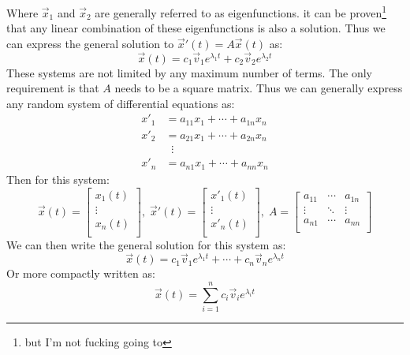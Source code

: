 \documentclass[11pt, a4paper]{article}
\begin{document}
Where $\vec{x}_1$ and $\vec{x}_2$ are generally referred to as eigenfunctions. it can be proven\footnote{but I'm not fucking going to} that any linear combination of these eigenfunctions is also a solution. Thus we can express the general solution to $\vec{x}'(t) = A\vec{x}(t)$ as:
\begin{equation*}
  \vec{x}(t) = c_1\vec{v}_1e^{\lambda_1 t} + c_2\vec{v}_2e^{\lambda_2 t}
\end{equation*}
These systems are not limited by any maximum number of terms. The only requirement is that $A$ needs to be a square matrix. Thus we can generally express any random system of differential equations as:
\begin{align*}
  x'_1 &= a_{11}x_1 + \cdots + a_{1n}x_n\\
  x'_2 &= a_{21}x_1 + \cdots + a_{2n}x_n\\
       &\;\;\vdots \\
  x'_n &= a_{n1}x_1 + \cdots + a_{nn}x_n
\end{align*}
Then for this system:
\begin{equation*}
  \vec{x}(t) = 
  \begin{bmatrix}
    x_1(t)\\
    \vdots\\
    x_n(t)\\
  \end{bmatrix}, \;
  \vec{x}'(t) = 
  \begin{bmatrix}
    x'_1(t)\\
    \vdots\\
    x'_n(t)\\
  \end{bmatrix}, \;
  A = 
  \begin{bmatrix}
    a_{11} & \cdots & a_{1n}\\
    \vdots & \ddots & \vdots\\
    a_{n1} & \cdots & a_{nn}\\
  \end{bmatrix}
\end{equation*}
We can then write the general solution for this system as:
\begin{equation*}
  \vec{x}(t) = c_1\vec{v}_1e^{\lambda_1 t} + \cdots + c_n\vec{v}_ne^{\lambda_n t}
\end{equation*}
Or more compactly written as:
\begin{equation*}
  \vec{x}(t) = \sum_{i=1}^{n} c_i\vec{v}_ie^{\lambda_i t}
\end{equation*}
\end{document}

